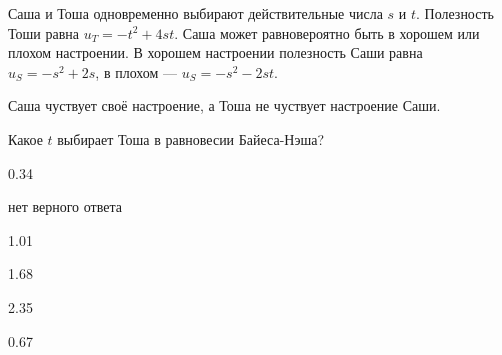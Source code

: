 
\begin{question}
Саша и Тоша одновременно выбирают действительные числа \(s\) и \(t\).
Полезность Тоши равна \(u_T = -t^2 + 4st\). Саша может равновероятно
быть в хорошем или плохом настроении. В хорошем настроении полезность
Саши равна \(u_S = -s^2 + 2s\), в плохом --- \(u_S = -s^2 - 2st\).

Саша чуствует своё настроение, а Тоша не чуствует настроение Саши.

Какое \(t\) выбирает Тоша в равновесии Байеса-Нэша?
\begin{answerlist}
  \item 0.34
  \item нет верного ответа
  \item 1.01
  \item 1.68
  \item 2.35
  \item 0.67
\end{answerlist}
\end{question}


